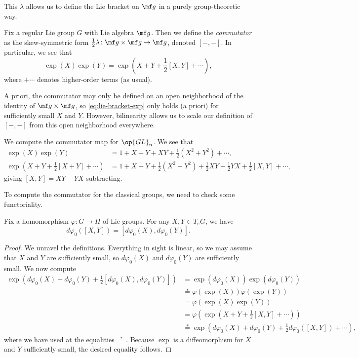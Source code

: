 \documentclass[../notes.tex]{subfiles}
\begin{document}
This $\lambda$ allows us to define the Lie bracket on $\mf g$ in a purely group-theoretic way.
\begin{definition}
	Fix a regular Lie group $G$ with Lie algebra $\mf g$. Then we define the \textit{commutator} as the skew-symmetric form $\frac12\lambda\colon\mf g\times\mf g\to\mf g$, denoted $[-,-]$. In particular, we see that
	\begin{equation}
		\exp(X)\exp(Y)=\exp\left(X+Y+\frac12[X,Y]+\cdots\right), \label{eq:lie-bracket-exp}
	\end{equation}
	where $+\cdots$ denotes higher-order terms (as usual).
\end{definition}
\begin{remark}
	A priori, the commutator may only be defined on an open neighborhood of the identity of $\mf g\times\mf g$, so \eqref{eq:lie-bracket-exp} only holds (a priori) for sufficiently small $X$ and $Y$. However, bilinearity allows us to scale our definition of $[-,-]$ from this open neighborhood everywhere.
\end{remark}
\begin{example} \label{ex:gl-bracket}
	We compute the commutator map for $\op{GL}_n$. We see that
	\begin{align}
		\exp(X)\exp(Y) &= 1+X+Y+XY+\frac12\left(X^2+Y^2\right)+\cdots, \\
		\exp\left(X+Y+\frac12[X+Y]+\cdots\right) &= 1+X+Y+\frac12\left(X^2+Y^2\right)+\frac12XY+\frac12YX+\frac12[X,Y]+\cdots,
	\end{align}
	giving $[X,Y]=XY-YX$ subtracting.
\end{example}
To compute the commutator for the classical groups, we need to check some functoriality.
\begin{proposition} \label{prop:lie-bracket-functoriality}
	Fix a homomorphism $\varphi\colon G\to H$ of Lie groups. For any $X,Y\in T_eG$, we have
	\[d\varphi_0([X,Y])=[d\varphi_0(X),d\varphi_0(Y)].\]
\end{proposition}
\begin{proof}
	We unravel the definitions. Everything in sight is linear, so we may assume that $X$ and $Y$ are sufficiently small, so $d\varphi_0(X)$ and $d\varphi_0(Y)$ are sufficiently small. We now compute
	\begin{align*}
		\exp\left(d\varphi_0(X)+d\varphi_0(Y)+\frac12[d\varphi_0(X),d\varphi_0(Y)]\right) &= \exp\left(d\varphi_0(X)\right)\exp\left(d\varphi_0(Y)\right) \\
		&\stackrel*= \varphi(\exp(X))\varphi(\exp(Y)) \\
		&= \varphi(\exp(X)\exp(Y)) \\
		&= \varphi\left(\exp\left(X+Y+\frac12[X,Y]+\cdots\right)\right) \\
		&\stackrel*= \exp\left(d\varphi_0(X)+d\varphi_0(Y)+\frac12d\varphi_0([X,Y])+\cdots\right),
	\end{align*}
	where we have used  at the equalities $\stackrel*=$. Because $\exp$ is a diffeomorphism for $X$ and $Y$ sufficiently small, the desired equality follows.
\end{proof}
\end{document}
